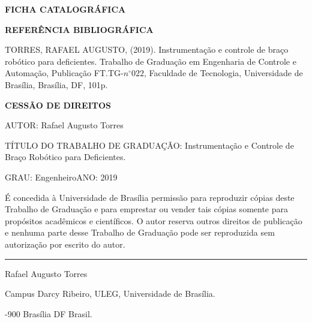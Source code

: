 \noindent \textbf{FICHA CATALOGRÁFICA}

\noindent %

\noindent \medskip{}


\noindent \textbf{REFERÊNCIA BIBLIOGRÁFICA}

TORRES, RAFAEL AUGUSTO, (2019). Instrumentação e controle de braço robótico para deficientes. Trabalho de Graduação
em Engenharia de Controle e Automação, Publicação FT.TG-$n^{\circ}022$,
Faculdade de Tecnologia, Universidade de Brasília, Brasília, DF, 101p.

\noindent \bigskip{}


\noindent \textbf{CESSÃO DE DIREITOS}

\noindent AUTOR: Rafael Augusto Torres

TÍTULO DO TRABALHO DE GRADUAÇÃO: Instrumentação e Controle de Braço Robótico para Deficientes.

\noindent \medskip{}


\noindent GRAU: Engenheiro\hfill{}ANO: 2019\hfill{}

\noindent \medskip{}


É concedida à Universidade de Brasília permissão para reproduzir cópias
deste Trabalho de Graduação e para emprestar ou vender tais cópias
somente para propósitos acadêmicos e científicos. O autor reserva
outros direitos de publicação e nenhuma parte desse Trabalho de Graduação
pode ser reproduzida sem autorização por escrito do autor.

\noindent \bigskip{}


\noindent \rule[0.5ex]{1\columnwidth}{1pt}

\noindent Rafael Augusto Torres

\noindent Campus Darcy Ribeiro, ULEG, Universidade de Brasília.

-900 Brasília \textendash{} DF \textendash{} Brasil.
